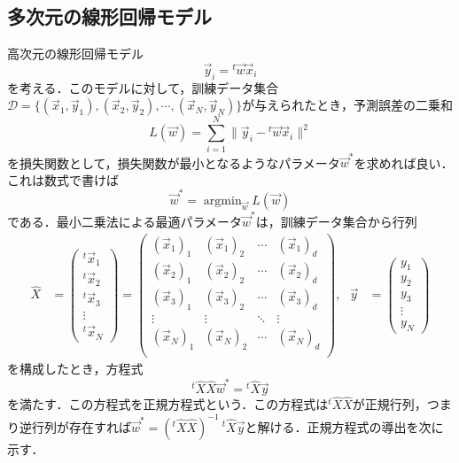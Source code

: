\subsection{多次元の線形回帰モデル}
高次元の線形回帰モデル
\begin{equation}
    \vec{y}_i={}^t\vec{w}\vec{x}_i
\end{equation}
を考える．このモデルに対して，訓練データ集合$\mathcal{D}=\{(\vec{x}_1,\vec{y}_1),(\vec{x}_2,\vec{y}_2),\cdots,(\vec{x}_N,\vec{y}_N)\}$が与えられたとき，予測誤差の二乗和
\begin{equation}
    L(\vec{w}) = \sum_{i=1}^{N}\|\vec{y}_i-{}^t\vec{w}\vec{x}_i\|^2
\end{equation}
を損失関数として，損失関数が最小となるようなパラメータ$\vec{w}^{\ast}$を求めれば良い．これは数式で書けば
\begin{equation}
    \vec{w}^{\ast} = \mathop{\arg\min}_{\vec{w}} L(\vec{w})
\end{equation}
である．最小二乗法による最適パラメータ$\vec{w}^{\ast}$は，訓練データ集合から行列
\begin{align}
    \hat{X}
    &
    =\left(
        \begin{array}{c}
       {}^t\vec{x}_1\\[5pt]
       {}^t\vec{x}_2\\[5pt]
       {}^t\vec{x}_3\\[5pt]
       \vdots\\[5pt]
       {}^t\vec{x}_N
        \end{array}
    \right)
    =
    \left(
        \begin{array}{cccc}
       (\vec{x}_1)_1&(\vec{x}_1)_2&\cdots&(\vec{x}_1)_d\\[10pt]
       (\vec{x}_2)_1&(\vec{x}_2)_2&\cdots&(\vec{x}_2)_d\\[10pt]
       (\vec{x}_3)_1&(\vec{x}_3)_2&\cdots&(\vec{x}_3)_d\\[10pt]
       \vdots&\vdots&\ddots&\vdots\\[10pt]
       (\vec{x}_N)_1&(\vec{x}_N)_2&\cdots&(\vec{x}_N)_d\\[10pt]
        \end{array}
    \right),\ \ \ 
    \vec{y}
    &
    =\left(
        \begin{array}{c}
       {y}_1\\[5pt]
       {y}_2\\[5pt]
       {y}_3\\[5pt]
       \vdots\\[5pt]
       {y}_N
        \end{array}
    \right)
\end{align}
を構成したとき，方程式
\begin{equation}
    {}^t\hat{X}\hat{X}\vec{w}^\ast = {}^t\hat{X}\vec{y}
\end{equation}
を満たす．この方程式を正規方程式という．この方程式は${}^t\hat{X}\hat{X}$が正規行列，つまり逆行列が存在すれば$\vec{w}^\ast = ({}^t\hat{X}\hat{X})^{-1}\ {}^t\hat{X}\vec{y}$と解ける．正規方程式の導出を次に示す．


